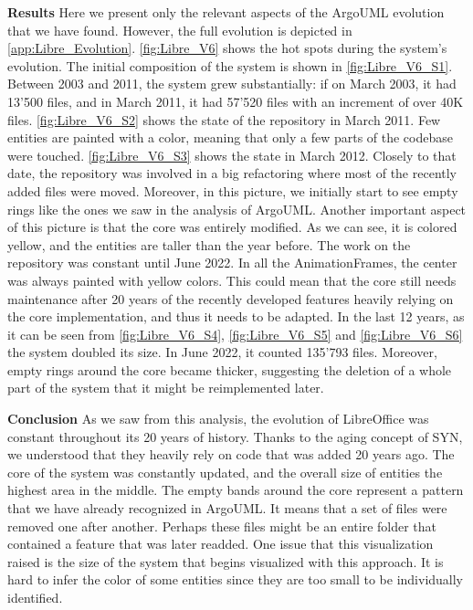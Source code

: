 \textbf{Results}
Here we present only the relevant aspects of the ArgoUML evolution that we have found. However, the full evolution is depicted in \autoref{app:Libre_Evolution}. \autoref{fig:Libre_V6} shows the hot spots during the system's evolution. The initial composition of the system is shown in \autoref{fig:Libre_V6_S1}. Between 2003 and 2011, the system 
grew substantially: if on March 2003, it had 13'500 files, and in March 2011, it had 57'520 files with an increment of over 40K files. \autoref{fig:Libre_V6_S2} shows the state of the repository in March 2011. Few entities are painted with a color, meaning that only a few parts of the codebase were touched. \autoref{fig:Libre_V6_S3} shows the state in March 2012. Closely to that date, the repository was involved in a big refactoring where most of the recently added files were moved. Moreover, in this picture, we initially start to see empty rings like the ones we saw in the analysis of ArgoUML. Another important aspect of this picture is that the core was entirely modified. As we can see, it is colored yellow, and the entities are taller than the year before. The work on the repository was constant until June 2022. In all the AnimationFrames, the center was always painted with yellow colors. This could mean that the core still needs maintenance after 20 years of the recently developed features heavily relying on the core implementation, and thus it needs to be adapted. In the last 12 years, as it can be seen from \ref{fig:Libre_V6_S4}, \ref{fig:Libre_V6_S5} and \ref{fig:Libre_V6_S6} the system doubled its size. In June 2022, it counted 135'793 files. Moreover, empty rings around the core became thicker, suggesting the deletion of a whole part of the system that it might be reimplemented later.

\bigbreak
\textbf{Conclusion} As we saw from this analysis, the evolution of LibreOffice was constant throughout its 20 years of history. 
Thanks to the aging concept of SYN, we understood that they heavily rely on code that was added 20 years ago. The core of the system was constantly updated, and the overall size of entities the highest area in the middle. The empty bands around the core represent a pattern that we have already recognized in ArgoUML. It means that a set of files were removed one after another. Perhaps these files might be an entire folder that contained a feature that was later readded. One issue that this visualization raised is the size of the system that begins visualized with this approach. It is hard to infer the color of some entities since they are too small to be individually identified. 

